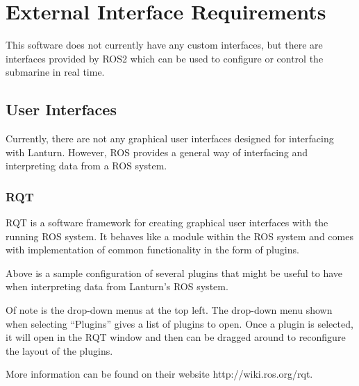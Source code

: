 \section{External Interface Requirements}
\label{sec:external}

This software does not currently have any custom interfaces, but there are
interfaces provided by ROS2 which can be used to configure or control the
submarine in real time.
\par

\subsection{User Interfaces}
\label{sec:user}

Currently, there are not any graphical user interfaces designed for interfacing
with Lanturn. However, ROS provides a general way of interfacing and
interpreting data from a ROS system. 
\par

\subsubsection*{RQT}
\label{sec:rqt}

RQT is a software framework for creating graphical user interfaces with the
running ROS system. It behaves like a module within the ROS system and comes
with implementation of common functionality in the form of plugins.
\par

Above is a sample configuration of several plugins that might be useful to have
when interpreting data from Lanturn’s ROS system. 
\par

Of note is the drop-down menus at the top left. The drop-down menu shown when
selecting “Plugins” gives a list of plugins to open. Once a plugin is selected,
it will open in the RQT window and then can be dragged around to reconfigure
the layout of the plugins. 
\par

More information can be found on their website http://wiki.ros.org/rqt.
\par

